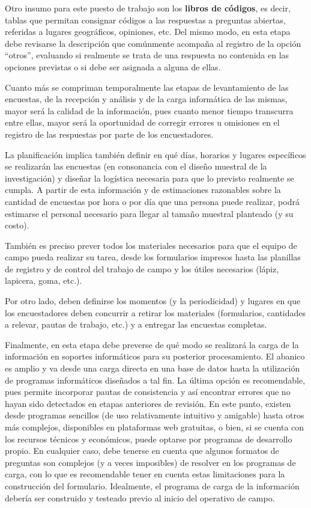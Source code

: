 \documentclass[
]{book}
\begin{document}
Otro insumo para este puesto de trabajo son los \textbf{libros de códigos}, es decir, tablas que permitan consignar códigos a las respuestas a preguntas abiertas, referidas a lugares geográficos, opiniones, etc. Del mismo modo, en esta etapa debe revisarse la descripción que comúnmente acompaña al registro de la opción ``otros'', evaluando si realmente se trata de una respuesta no contenida en las opciones previstas o si debe ser asignada a alguna de ellas.

Cuanto más se compriman temporalmente las etapas de levantamiento de las encuestas, de la recepción y análisis y de la carga informática de las mismas, mayor será la calidad de la información, pues cuanto menor tiempo transcurra entre ellas, mayor será la oportunidad de corregir errores u omisiones en el registro de las respuestas por parte de los encuestadores.

La planificación implica también definir en qué días, horarios y lugares específicos se realizarán las encuestas (en consonancia con el diseño muestral de la investigación) y diseñar la logística necesaria para que lo previsto realmente se cumpla. A partir de esta información y de estimaciones razonables sobre la cantidad de encuestas por hora o por día que una persona puede realizar, podrá estimarse el personal necesario para llegar al tamaño muestral planteado (y su costo).

También es preciso prever todos los materiales necesarios para que el equipo de campo pueda realizar su tarea, desde los formularios impresos hasta las planillas de registro y de control del trabajo de campo y los útiles necesarios (lápiz, lapicera, goma, etc.).

Por otro lado, deben definirse los momentos (y la periodicidad) y lugares en que los encuestadores deben concurrir a retirar los materiales (formularios, cantidades a relevar, pautas de trabajo, etc.) y a entregar las encuestas completas.

Finalmente, en esta etapa debe preverse de qué modo se realizará la carga de la información en soportes informáticos para su posterior procesamiento. El abanico es amplio y va desde una carga directa en una base de datos hasta la utilización de programas informáticos diseñados a tal fin. La última opción es recomendable, pues permite incorporar pautas de consistencia y así encontrar errores que no hayan sido detectados en etapas anteriores de revisión. En este punto, existen desde programas sencillos (de uso relativamente intuitivo y amigable) hasta otros más complejos, disponibles en plataformas web gratuitas, o bien, si se cuenta con los recursos técnicos y económicos, puede optarse por programas de desarrollo propio. En cualquier caso, debe tenerse en cuenta que algunos formatos de preguntas son complejos (y a veces imposibles) de resolver en los programas de carga, con lo que es recomendable tener en cuenta estas limitaciones para la construcción del formulario. Idealmente, el programa de carga de la información debería ser construido y testeado previo al inicio del operativo de campo.
\end{document}
